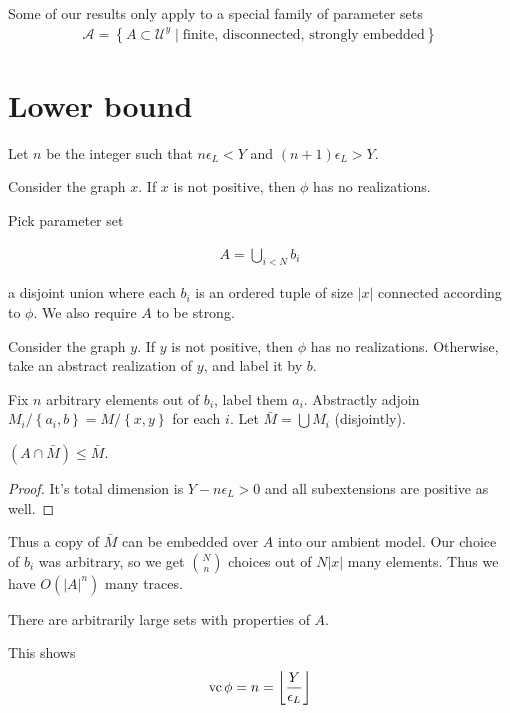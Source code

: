 \documentclass{amsart}
\renewcommand{\AA}{\mathscr A}
\newcommand{\U}{\mathcal U}
\newcommand{\curly}[1]{\left\{#1\right\}}
\providecommand{\floor}[1]{\left \lfloor #1 \right \rfloor }
\begin{document}
Some of our results only apply to a special family of parameter sets
\begin{align*}
	\AA = \curly{A \subset \U^{y} \mid \text{finite, disconnected, strongly embedded}}
\end{align*}

\section{Lower bound}

Let $n$ be the integer such that $n \epsilon_L < Y$ and $(n+1) \epsilon_L > Y$.

Consider the graph $x$.
If $x$ is not positive, then $\phi$ has no realizations.

Pick parameter set 

\begin{align*}
	A = \bigcup_{i<N} b_i
\end{align*}

a disjoint union where each $b_i$ is an ordered tuple of size $|x|$ connected according to $\phi$.
We also require $A$ to be strong.

Consider the graph $y$.
If $y$ is not positive, then $\phi$ has no realizations.
Otherwise, take an abstract realization of $y$, and label it by $b$.

Fix $n$ arbitrary elements out of $b_i$, label them $a_i$.
Abstractly adjoin $M_i/\curly{a_i, b} = M/\curly{x,y}$ for each $i$.
Let $\bar M = \bigcup M_i$ (disjointly).

\begin{Claim}
	$(A \cap \bar M) \leq \bar M$.
\end{Claim}
\begin{proof}
	It's total dimension is $Y - n\epsilon_L > 0$ and all subextensions are positive as well.
\end{proof}

Thus a copy of $\bar M$ can be embedded over $A$ into our ambient model.
Our choice of $b_i$ was arbitrary, so we get ${N \choose n}$ choices out of $N|x|$ many elements.
Thus we have $O(|A|^n)$ many traces.
\begin{Lemma}
	There are arbitrarily large sets with properties of $A$.
\end{Lemma}
This shows
\begin{align*}
	\vc \phi = n = \floor{\frac{Y}{\epsilon_L}}
\end{align*}
\end{document}
